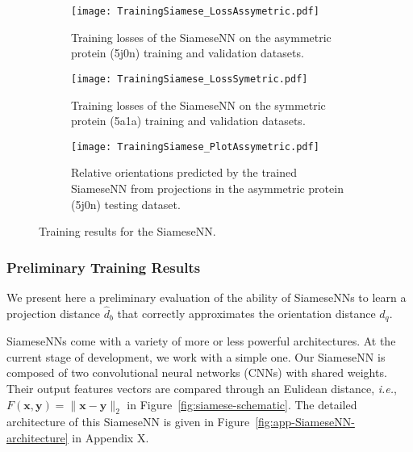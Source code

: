 \begin{figure}[t!]
    \centering
    \begin{subfigure}[t]{0.4\textwidth}
        \texttt{[image: TrainingSiamese\_LossAssymetric.pdf]}
        \caption{Training losses of the SiameseNN on the asymmetric protein (5j0n) training and validation datasets.}
        \label{fig:losses-siamese-assym}
    \end{subfigure} \quad \quad
    \begin{subfigure}[t]{0.4\textwidth}
        \texttt{[image: TrainingSiamese\_LossSymetric.pdf]}
        \caption{Training losses of the SiameseNN on the symmetric protein (5a1a) training and validation datasets.}
        \label{fig:losses-siamese-sym}
    \end{subfigure} \vspace{0.45cm}

    \begin{subfigure}[t]{0.4\textwidth}
        \texttt{[image: TrainingSiamese\_PlotAssymetric.pdf]}
        \caption{Relative orientations predicted by the trained SiameseNN from projections in the asymmetric protein (5j0n) testing dataset. }
        \label{fig:learned-distance-siamese}
    \end{subfigure} \vspace{0.35cm}
    \caption{Training results for the SiameseNN.}
    \label{fig:losses-siamese}
\end{figure}


\subsubsection{Preliminary Training Results}

We present here a preliminary evaluation of the ability of SiameseNNs to learn a projection distance $\widehat{d}_b$ that correctly approximates the orientation distance $d_q$.

SiameseNNs come with a variety of more or less powerful architectures. At the current stage of development, we work with a simple one. Our SiameseNN is composed of two convolutional neural networks (CNNs) with shared weights. Their output features vectors are compared through an Eulidean distance, \textit{i.e.}, $F(\mathbf{x},\mathbf{y})=\lVert \mathbf{x}-\mathbf{y}\rVert_2$ in Figure~\ref{fig:siamese-schematic}. The detailed architecture of this SiameseNN is given in Figure~\ref{fig:app-SiameseNN-architecture} in Appendix X.

